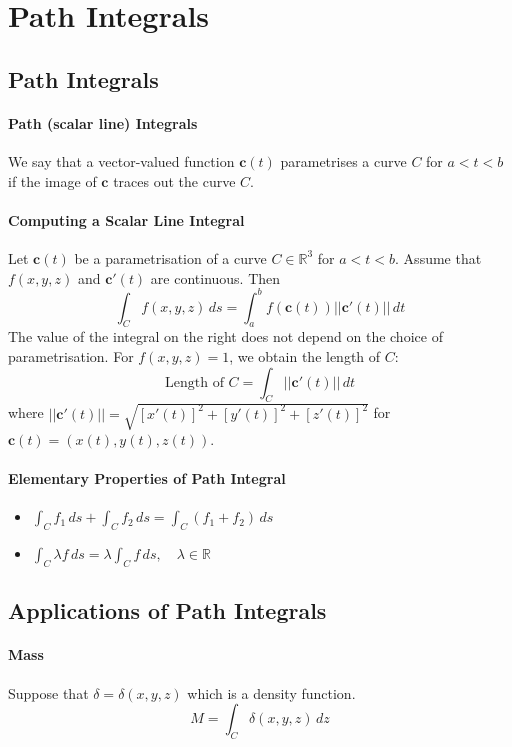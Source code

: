 
\section{Path Integrals}
\subsection{Path Integrals}
\paragraph{Path (scalar line) Integrals}
We say that a vector-valued function \(\textbf{c}(t)\) parametrises a curve \(C\) for \(a < t < b\) if the image of \(\textbf{c}\) traces out the curve \(C\). 

\paragraph{Computing a Scalar Line Integral}
Let \(\textbf{c}(t)\) be a parametrisation of a curve \(C \in \mathbb R^3\) for \(a < t < b\). Assume that \(f(x,y,z)\) and \(\textbf{c}'(t)\) are continuous. Then 
\[\int_C f(x,y,z) \, ds = \int_a^b f(\textbf{c}(t))||\textbf{c}'(t)|| \, dt \]
The value of the integral on the right does not depend on the choice of parametrisation. For \(f(x,y,z) = 1\), we obtain the length of \(C\):
\[\text{Length of } C = \int_C ||\textbf{c}'(t)|| \, dt\]
where \(||\textbf{c}'(t)|| = \sqrt{[x'(t)]^2 + [y'(t)]^2 + [z'(t)]^2}\) for \(\textbf{c}(t) = (x(t), y(t), z(t))\).

\paragraph{Elementary Properties of Path Integral}
\begin{itemize}
    \item \(\int_C f_1 \, ds + \int_C f_2 \, ds = \int_C (f_1 + f_2) \, ds\)
    \item \(\int_C \lambda f \, ds = \lambda \int_C f \, ds, \quad \lambda \in \mathbb R\)
\end{itemize}

\subsection{Applications of Path Integrals}
\paragraph{Mass}
Suppose that \(\delta = \delta(x,y,z)\) which is a density function.
\[M = \int_C \delta(x,y,z) \, dz\]
